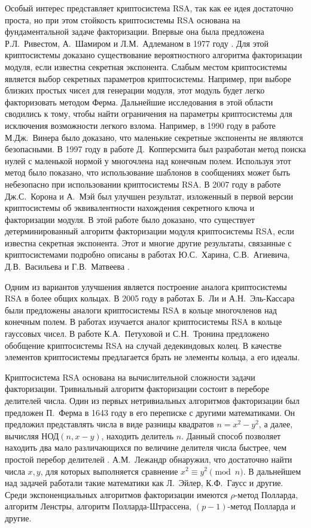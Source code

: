 \documentclass[_00_dissertation.tex]{subfiles}
\begin{document}
Особый интерес представляет криптосистема RSA, так как ее идея достаточно проста, но при этом стойкость криптосистемы RSA основана на фундаментальной задаче факторизации.
Впервые она была предложена Р.Л.~Ривестом, А.~Шамиром и Л.М.~Адлеманом в 1977 году \cite{source:Rivest}.
Для этой криптосистемы доказано существование вероятностного алгоритма факторизации модуля, если известна секретная экспонента.
Слабым местом криптосистемы является выбор секретных параметров криптосистемы.
Например, при выборе близких простых чисел для генерации модуля, этот модуль будет легко факторизовать методом Ферма.
Дальнейшие исследования в этой области сводились к тому, чтобы найти ограничения на параметры криптосистемы для исключения возможности легкого взлома.
Например, в 1990 году в работе М.Дж.~Винера \cite{source:Wiener} было доказано, что маленькие секретные экспоненты не являются безопасными.
В 1997 году в работе Д.~Копперсмита \cite{source:Coppersmith} был разработан метод поиска нулей с маленькой нормой у многочлена над конечным полем.
Используя этот метод было показано, что использование шаблонов в сообщениях может быть небезопасно при использовании криптосистемы RSA.
В 2007 году в работе Дж.С.~Корона и А.~Мэй \cite{source:Coron} был улучшен результат, изложенный в первой версии криптосистемы об эквивалентности нахождения секретного ключа и факторизации модуля.
В этой работе было доказано, что существует детерминированный алгоритм факторизации модуля криптосистемы RSA, если известна секретная экспонента.
Этот и многие другие результаты, связанные с криптосистемами подробно описаны в работах Ю.С.~Харина, С.В.~Агиевича, Д.В.~Васильева и Г.В.~Матвеева \cite{source:Kharin, source:Matveev_2019, source:Matveev_2018}.

Одним из вариантов улучшения является построение аналога криптосистемы RSA в более общих кольцах.
В 2005 году в работах Б.~Ли и А.Н.~Эль-Кассара \cite{source:Li, source:El_Kassar} были предложены аналоги криптосистемы RSA в кольце многочленов над конечным полем.
В работах \cite{source:Elkamchouchi, source:Koval, source:El_Kassar} изучается аналог криптосистемы RSA в кольце гауссовых чисел.
В работе К.А.~Петуховой и С.Н.~Тронина \cite{source:Petukhova} предложено обобщение криптосистемы RSA на случай дедекиндовых колец.
В качестве элементов криптосистемы предлагается брать не элементы кольца, а его идеалы.

Криптосистема RSA основана на вычислительной сложности задачи факторизации.
Тривиальный алгоритм факторизации состоит в переборе делителей числа.
Один из первых нетривиальных алгоритмов факторизации был предложен П.~Ферма в 1643 году в его переписке с другими математиками.
Он предложил представлять числа в виде разницы квадратов $n = x^2 - y^2$, а далее, вычисляя $\textrm{НОД}(n,x-y)$, находить делитель $n$.
Данный способ позволяет находить два мало различающихся по величине делителя числа быстрее, чем простой перебор делителей \cite{source:Yaschenko}.
А.М.~Лежандр обнаружил, что достаточно найти числа $x, y$, для которых выполняется сравнение $x^{2}\equiv y^{2}\pmod{n}$.
В дальнейшем над задачей работали такие математики как Л.~Эйлер, К.Ф.~Гаусс и другие.
Среди экспоненциальных алгоритмов факторизации имеются $\rho$-метод Полларда, алгоритм Ленстры, алгоритм Полларда-Штрассена, $(p-1)$-метод Полларда и другие.
\end{document}

